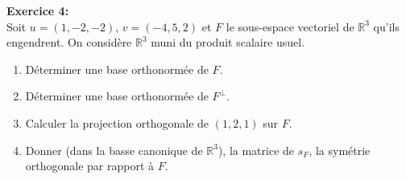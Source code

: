\documentclass[a4paper, 11pt]{article}
\theoremstyle{plain}
\newcommand{\R}{\mathbb{R}}
\begin{document}
\bigskip
\noindent
\textbf{Exercice 4:}\\
Soit 
$u=(1,-2,-2)$,  
$v=(-4,5,2)$ et $F$ le sous-espace vectoriel de 
$\R^3$ qu'ils engendrent. On considère $\R^3$ muni 
du produit scalaire usuel.
\begin{enumerate}
\item 
Déterminer une base orthonormée de $F$.
\item 
Déterminer une base orthonormée de $F^{\perp}$.
\item Calculer la projection orthogonale de $(1,2,1)$ sur $F$.
\item 
Donner (dans la basse canonique de $\R^3$), 
la matrice de $s_F$, la symétrie orthogonale par rapport à $F$.
\end{enumerate}
\end{document}
